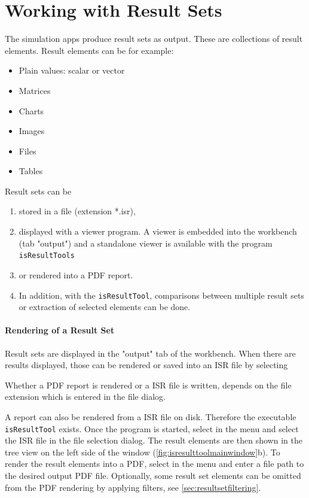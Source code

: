 \section{Working with Result Sets}

The simulation apps produce result sets as output.
These are collections of result elements.
Result elements can be for example:
\begin{itemize}
\item Plain values: scalar or vector
\item Matrices
\item Charts
\item Images
\item Files
\item Tables
\end{itemize}

Result sets can be
\begin{enumerate}
\item stored in a file (extension *.isr),
\item displayed with a viewer program. A viewer is embedded into the workbench (tab "output") and a standalone viewer is available with the program \texttt{isResultTools}
\item or rendered into a PDF report.
\item In addition, with the \texttt{isResultTool}, comparisons between multiple result sets or extraction of selected elements can be done.
\end{enumerate}

\paragraph{Rendering of a Result Set}

Result sets are displayed in the "output" tab of the workbench.
When there are results displayed, those can be rendered or saved into an ISR file by selecting 

Whether a PDF report is rendered or a ISR file is written, depends on the file extension which is entered in the file dialog.

A report can also be rendered from a ISR file on disk.
Therefore the executable \texttt{isResultTool} exists. 
Once the program is started, select in the menu  and select the ISR file in the file selection dialog.
The result elements are then shown in the tree view on the left side of the window (\ref{fig:isresulttoolmainwindow}b).
To render the result elements into a PDF, select in the menu  and enter a file path to the desired output PDF file.
Optionally, some result set elements can be omitted from the PDF rendering by applying filters, see \ref{sec:resultsetfiltering}.


